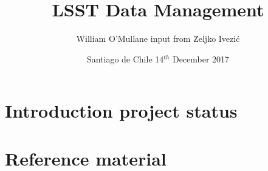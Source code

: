 \documentclass[t,aspectratio=169]{beamer}
\author{William O'Mullane  {\tiny input from \u{Z}eljko Ivezi\'c }}
\date{Santiago de Chile  14$^{th}$  December 2017}
\title{LSST Data Management}
\begin{document}
\maketitle


\section{Introduction project status}














\appendix
\section {Reference material}

\end{document}
